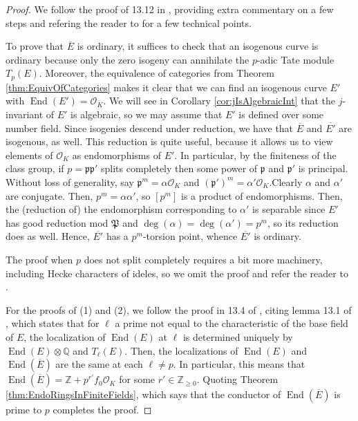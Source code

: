 \documentclass{amsart}
\theoremstyle{definition}
\theoremstyle{remark}
\numberwithin{equation}{section}
\newcommand{\cO}{\mathcal O}
\newcommand{\fkp}{\mathfrak p}
\newcommand{\fkP}{\mathfrak{P}}
\newcommand{\bbQ}{\mathbb Q}
\newcommand{\bbZ}{\mathbb Z}
\DeclareMathOperator{\End}{End}
\begin{document}
\begin{proof}
We follow the proof of 13.12 in \cite{LangEF}, providing extra commentary on a few steps and refering the reader to \cite{LangEF} for a few technical points.

To prove that $\overline{E}$ is ordinary, it suffices to check that an isogenous curve is ordinary because only the zero isogeny can annihilate the $p$-adic Tate module $T_{p}(E)$. Moreover, the equivalence of categories from Theorem \ref{thm:EquivOfCategories} makes it clear that we can find an isogenous curve $E'$ with $\End(E') = \cO_{K}$. We will see in Corollary \ref{cor:jIsAlgebraicInt}
that the $j$-invariant of $E'$ is algebraic, so we may assume that $E'$ is defined over some number field. Since isogenies descend under reduction, we have that $\overline{E}$ and $\overline{E'}$ are isogenous, as well. This reduction is quite useful, because it allows us to view elements of $\cO_{K}$  as endomorphisms of $E'$. In particular, by the finiteness of the class group, if $p = \fkp \fkp'$ splits completely then some power of $\fkp$ and $\fkp'$ is principal. Without loss of generality, say $\fkp^m = \alpha\cO_{K}$ and $(\fkp')^m = \alpha'\cO_{K}$.Clearly $\alpha$ and $\alpha'$ are conjugate. Then, $p^m = \alpha \alpha'$, so $[p^m]$ is a product of endomorphisms. Then, the (reduction of) the endomorphism corresponding to $\alpha'$ is separable since $E'$ has good reduction mod $\fkP$ and $\deg(\alpha) = \deg(\alpha') = p^m$, so its reduction does as well. Hence, $\overline{E'}$ has a $p^m$-torsion point, whence $\overline{E'}$ is ordinary.

The proof when $p$ does not split completely requires a bit more machinery, including Hecke characters of ideles, so we omit the proof and refer the reader to \cite{LangEF}.

For the proofs of (1) and (2), we follow the proof in 13.4 of \cite{LangEF}, citing lemma 13.1 of \cite{LangEF}, which states that for $\ell$ a prime not equal to the characteristic of the base field of $E$, the localization of $\End(E)$ at $\ell$ is determined uniquely by $\End(E) \otimes \bbQ$ and $T_{\ell}(E)$. Then, the localizations of $\End(E)$ and $\End(\overline{E})$ are the same at each $\ell \neq p$. In particular, this means that $\End(\overline{E}) = \bbZ + p^{r'} f_{0} \cO_{K}$ for some $r' \in \bbZ_{\geq 0}$. Quoting Theorem \ref{thm:EndoRingsInFiniteFields}, which says that the conductor of $\End(\overline{E})$ is prime to $p$ completes the proof.

\end{proof}
\end{document}
